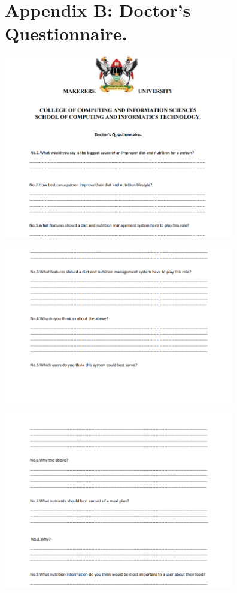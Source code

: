 \documentclass{article}
\begin{document}
\newpage
\appendix
\renewcommand{\thesection}{} %
\section{Appendix B: Doctor's Questionnaire.}

\vspace{30pt}
\begin{center}

    \includegraphics[width=380px]{images/doctors1.PNG}

    \includegraphics[width=380px]{images/doctors2.PNG}

    \includegraphics[width=380px]{images/doctors3.PNG}


\end{center}
\end{document}
